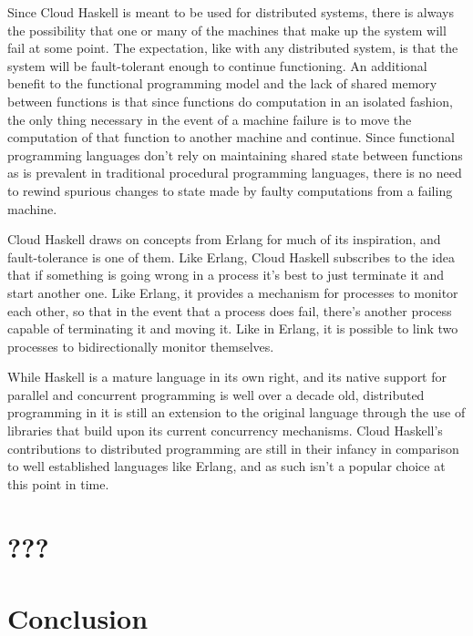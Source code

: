\documentclass[10pt,a4paper,twocolumn]{article}
\begin{document}
Since Cloud Haskell is meant to be used for distributed systems, there is always
the possibility that one or many of the machines that make up the system will
fail at some point. The expectation, like with any distributed system, is that
the system will be fault-tolerant enough to continue functioning. An additional
benefit to the functional programming model and the lack of shared memory
between functions is that since functions do computation in an isolated fashion,
the only thing necessary in the event of a machine failure is to move the
computation of that function to another machine and continue. Since functional
programming languages don't rely on maintaining shared state between functions
as is prevalent in traditional procedural programming languages, there is no
need to rewind spurious changes to state made by faulty computations from a
failing machine.

Cloud Haskell draws on concepts from Erlang for much of its inspiration, and
fault-tolerance is one of them. Like Erlang, Cloud Haskell subscribes to the
idea that if something is going wrong in a process it's best to just terminate
it and start another one. Like Erlang, it provides a mechanism for processes to
monitor each other, so that in the event that a process does fail, there's
another process capable of terminating it and moving it. Like in Erlang, it is
possible to link two processes to bidirectionally monitor themselves.

While Haskell is a mature language in its own right, and its native support for
parallel and concurrent programming is well over a decade old, distributed
programming in it is still an extension to the original language through the use
of libraries that build upon its current concurrency mechanisms. Cloud Haskell's
contributions to distributed programming are still in their infancy in
comparison to well established languages like Erlang, and as such isn't a
popular choice at this point in time.

\section{???}

\section{Conclusion}

\small



\end{document}
